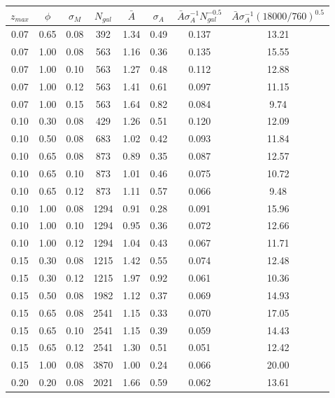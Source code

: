 \documentclass{aastex62}   	%
\begin{document}
\begin{table}
   \centering
   \begin{tabular}{|ccc|ccccc|} %
   \hline
$z_{max}$ & $\phi$ & $\sigma_{M}$ & $N_{gal}$ & $\bar{A}$ & $\sigma_A$ & $\bar{A} \sigma_A^{-1} N_{gal}^{-0.5}$ & $\bar{A} \sigma_A^{-1} (18000/760)^{0.5}$ \\
\hline
0.07 & 0.65 & 0.08 & 392 &   1.34 &   0.49 &  0.137 &  13.21 \\
0.07 & 1.00 & 0.08 & 563 &   1.16 &   0.36 &  0.135 &  15.55 \\
0.07 & 1.00 & 0.10 & 563 &   1.27 &   0.48 &  0.112 &  12.88 \\
0.07 & 1.00 & 0.12 & 563 &   1.41 &   0.61 &  0.097 &  11.15 \\
0.07 & 1.00 & 0.15 & 563 &   1.64 &   0.82 &  0.084 &   9.74 \\
0.10 & 0.30 & 0.08 & 429 &   1.26 &   0.51 &  0.120 &  12.09 \\
0.10 & 0.50 & 0.08 & 683 &   1.02 &   0.42 &  0.093 &  11.84 \\
0.10 & 0.65 & 0.08 & 873 &   0.89 &   0.35 &  0.087 &  12.57 \\
0.10 & 0.65 & 0.10 & 873 &   1.01 &   0.46 &  0.075 &  10.72 \\
0.10 & 0.65 & 0.12 & 873 &   1.11 &   0.57 &  0.066 &   9.48 \\
0.10 & 1.00 & 0.08 & 1294 &   0.91 &   0.28 &  0.091 &  15.96 \\
0.10 & 1.00 & 0.10 & 1294 &   0.95 &   0.36 &  0.072 &  12.66 \\
0.10 & 1.00 & 0.12 & 1294 &   1.04 &   0.43 &  0.067 &  11.71 \\
0.15 & 0.30 & 0.08 & 1215 &   1.42 &   0.55 &  0.074 &  12.48 \\
0.15 & 0.30 & 0.12 & 1215 &   1.97 &   0.92 &  0.061 &  10.36 \\
0.15 & 0.50 & 0.08 & 1982 &   1.12 &   0.37 &  0.069 &  14.93 \\
0.15 & 0.65 & 0.08 & 2541 &   1.15 &   0.33 &  0.070 &  17.05 \\
0.15 & 0.65 & 0.10 & 2541 &   1.15 &   0.39 &  0.059 &  14.43 \\
0.15 & 0.65 & 0.12 & 2541 &   1.30 &   0.51 &  0.051 &  12.42 \\
0.15 & 1.00 & 0.08 & 3870 &   1.00 &   0.24 &  0.066 &  20.00 \\
0.20 & 0.20 & 0.08 & 2021 &   1.66 &   0.59 &  0.062 &  13.61 \\

\end{tabular}
\end{table}
\end{document}
